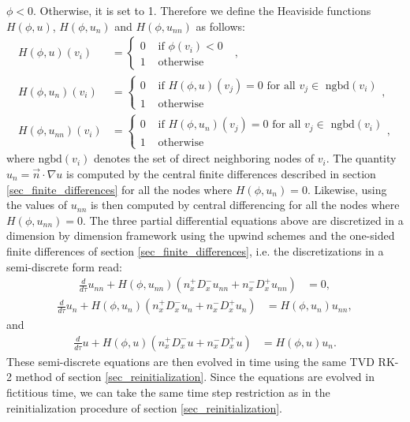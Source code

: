 \documentclass[english]{article}
\begin{document}
$\phi<0$. Otherwise, it is set to 1. Therefore we define the Heaviside functions $H(\phi,u)$,
$H(\phi,u_{n})$ and $H(\phi,u_{nn})$ as follows:
\begin{align*}
H(\phi,u)(v_i) &= \begin{cases}
                 0 & \text{ if $\phi(v_i)<0$ } \\
                 1 & \text{ otherwise}
                 \end{cases} ,\\
H(\phi,u_n)(v_i) &= \begin{cases}
                   0 & \text{ if $H(\phi,u)(v_j)=0$ for all $v_j\in$ ngbd$(v_i)$} \\
                   1 & \text{ otherwise}
                   \end{cases} ,\\
H(\phi,u_{nn})(v_i) &= \begin{cases}
                   0 & \text{ if $H(\phi,u_n)(v_j)=0$ for all $v_j\in$ ngbd$(v_i)$} \\
                   1 & \text{ otherwise}
                   \end{cases},
\end{align*}
where $\text{ngbd}(v_i)$ denotes the set of direct neighboring nodes of $v_i$. The quantity
$u_n=\vec{n}\cdot\nabla u$ is computed by the central finite differences described in section
\ref{sec_finite_differences} for all the nodes where $H(\phi,u_n)=0$. Likewise, using the values of
$u_{nn}$ is then computed by central differencing for all the nodes where $H(\phi,u_{nn})=0$. The
three partial differential equations above are discretized in a dimension by dimension framework
using the upwind schemes and the one-sided finite differences of section
\ref{sec_finite_differences}, i.e. the discretizations in a semi-discrete form read:
\begin{align*}
\frac{d}{d\tau}u_{nn}+H(\phi,u_{nn})\left(n_x^+D_x^-u_{nn}+n_x^-D_x^+u_{nn}\right)&=0,
\end{align*}
\begin{align*}
\frac{d}{d\tau}u_{n }+H(\phi,u_{n })\left(n_x^+D_x^-u_{n }+n_x^-D_x^+u_{n }\right)&=H(\phi,u_{n})
u_{nn},
\end{align*}
and
\begin{align*}
\frac{d}{d\tau}u     +H(\phi,u     )\left(n_x^+D_x^-u     + n_x^-D_x^+u    \right)&=H(\phi,u ) u_{n
}.
\end{align*}
These semi-discrete equations are then evolved in time using the same TVD RK-2 method of section
\ref{sec_reinitialization}. Since the equations are evolved in fictitious time, we can take the
same time step restriction as in the reinitialization procedure of section
\ref{sec_reinitialization}.
\end{document}
